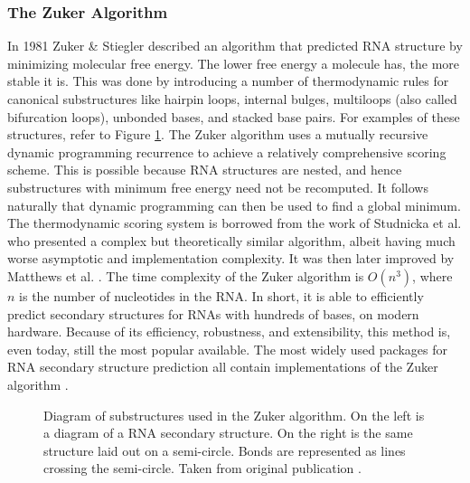 \documentclass[12pt, a4paper]{article}
\begin{document}
\subsubsection{The Zuker Algorithm}
In 1981 Zuker \& Stiegler \cite{zuker1981optimal}
described an algorithm that predicted RNA structure by minimizing molecular free energy. The lower free energy a molecule has, the more stable it is. This was done
by introducing a number of thermodynamic rules for canonical substructures like hairpin loops, internal bulges, multiloops (also called bifurcation loops), unbonded bases, and stacked base pairs. For examples of these structures, refer to Figure \ref{fig:zuk_struct}. The Zuker algorithm uses a mutually recursive dynamic programming recurrence to achieve a relatively comprehensive scoring scheme. This is possible because RNA structures are nested, and hence substructures with minimum free energy need not be recomputed. It follows naturally that dynamic programming can then be used to find a global minimum. The thermodynamic scoring system is borrowed from the work of Studnicka et al. \cite{studnicka1978computer} who presented a
complex but theoretically similar algorithm, albeit having
much worse asymptotic and implementation complexity. It was then later improved by Matthews et al. \cite{mathews1999expanded, mathews2004incorporating}. The time complexity of the Zuker algorithm is $O(n^3)$, where $n$ is the number of nucleotides in the RNA. In short, it is able to efficiently predict secondary structures for RNAs with hundreds of bases, on modern hardware.  Because of
its efficiency, robustness, and extensibility, this method is,
even today, still the most popular available. The most widely used packages for RNA secondary structure prediction all contain implementations of the Zuker algorithm \cite{lorenz2011viennarna, reuter2010rnastructure}.

\begin{figure}
\begin{center}
\end{center}
\caption{Diagram of substructures used in the Zuker algorithm. On the left is a diagram of a RNA secondary structure. On the right is the same structure laid out on a semi-circle. Bonds are represented as lines crossing the semi-circle. Taken from original
publication \cite{zuker1981optimal}.}
\label{fig:zuk_struct}
\end{figure}
\end{document}
